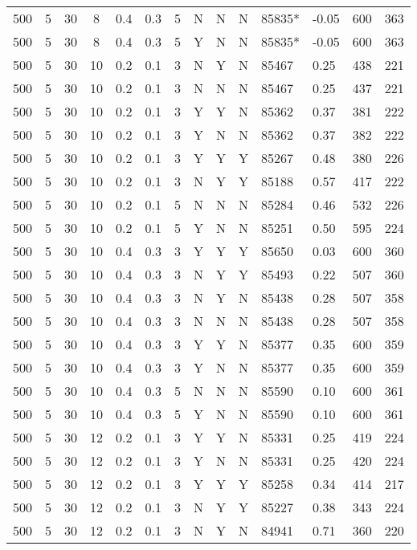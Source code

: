 \documentclass[a4paper, twocolumn, oneside, 10pt]{article}
\begin{document}
\begin{longtable}{|ccccccccccllll|}
	500 & 5 & 30 & 8 & 0.4 & 0.3 & 5 & N & N & N & 85835* & -0.05 & 600 & 363\\
	500 & 5 & 30 & 8 & 0.4 & 0.3 & 5 & Y & N & N & 85835* & -0.05 & 600 & 363\\
	500 & 5 & 30 & 10 & 0.2 & 0.1 & 3 & N & Y & N & 85467 & 0.25 & 438 & 221\\
	500 & 5 & 30 & 10 & 0.2 & 0.1 & 3 & N & N & N & 85467 & 0.25 & 437 & 221\\
	500 & 5 & 30 & 10 & 0.2 & 0.1 & 3 & Y & Y & N & 85362 & 0.37 & 381 & 222\\
	500 & 5 & 30 & 10 & 0.2 & 0.1 & 3 & Y & N & N & 85362 & 0.37 & 382 & 222\\
	500 & 5 & 30 & 10 & 0.2 & 0.1 & 3 & Y & Y & Y & 85267 & 0.48 & 380 & 226\\
	500 & 5 & 30 & 10 & 0.2 & 0.1 & 3 & N & Y & Y & 85188 & 0.57 & 417 & 222\\
	500 & 5 & 30 & 10 & 0.2 & 0.1 & 5 & N & N & N & 85284 & 0.46 & 532 & 226\\
	500 & 5 & 30 & 10 & 0.2 & 0.1 & 5 & Y & N & N & 85251 & 0.50 & 595 & 224\\
	500 & 5 & 30 & 10 & 0.4 & 0.3 & 3 & Y & Y & Y & 85650 & 0.03 & 600 & 360\\
	500 & 5 & 30 & 10 & 0.4 & 0.3 & 3 & N & Y & Y & 85493 & 0.22 & 507 & 360\\
	500 & 5 & 30 & 10 & 0.4 & 0.3 & 3 & N & Y & N & 85438 & 0.28 & 507 & 358\\
	500 & 5 & 30 & 10 & 0.4 & 0.3 & 3 & N & N & N & 85438 & 0.28 & 507 & 358\\
	500 & 5 & 30 & 10 & 0.4 & 0.3 & 3 & Y & Y & N & 85377 & 0.35 & 600 & 359\\
	500 & 5 & 30 & 10 & 0.4 & 0.3 & 3 & Y & N & N & 85377 & 0.35 & 600 & 359\\
	500 & 5 & 30 & 10 & 0.4 & 0.3 & 5 & N & N & N & 85590 & 0.10 & 600 & 361\\
	500 & 5 & 30 & 10 & 0.4 & 0.3 & 5 & Y & N & N & 85590 & 0.10 & 600 & 361\\
	500 & 5 & 30 & 12 & 0.2 & 0.1 & 3 & Y & Y & N & 85331 & 0.25 & 419 & 224\\
	500 & 5 & 30 & 12 & 0.2 & 0.1 & 3 & Y & N & N & 85331 & 0.25 & 420 & 224\\
	500 & 5 & 30 & 12 & 0.2 & 0.1 & 3 & Y & Y & Y & 85258 & 0.34 & 414 & 217\\
	500 & 5 & 30 & 12 & 0.2 & 0.1 & 3 & N & Y & Y & 85227 & 0.38 & 343 & 224\\
	500 & 5 & 30 & 12 & 0.2 & 0.1 & 3 & N & Y & N & 84941 & 0.71 & 360 & 220\\

\end{longtable}
\end{document}
